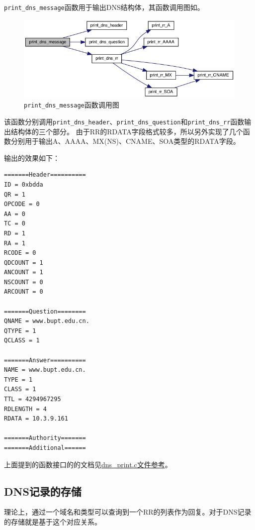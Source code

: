 \documentclass[lang=cn,11pt,a4paper,cite=authornum]{paper}
\begin{document}
\texttt{print_dns_message}函数用于输出DNS结构体，其函数调用图如。

\begin{figure}[htbp]

    \centering
    \includegraphics[width=0.8\linewidth]{./APIdoc/dns__print_8c_a33a39397e0f2e1a98b86b6d85321ee79_cgraph.png}
    \caption{\texttt{print_dns_message}函数调用图\label{fig:print_dns_message_call}}

\end{figure}

该函数分别调用\texttt{print_dns_header}、\texttt{print_dns_question}和\texttt{print_dns_rr}函数输出结构体的三个部分。
由于RR的RDATA字段格式较多，所以另外实现了几个函数分别用于输出A、AAAA、MX(NS)、CNAME、SOA类型的RDATA字段。

输出的效果如下：

\begin{code}
\begin{verbatim}
=======Header==========
ID = 0xbdda
QR = 1
OPCODE = 0
AA = 0
TC = 0
RD = 1
RA = 1
RCODE = 0
QDCOUNT = 1
ANCOUNT = 1
NSCOUNT = 0
ARCOUNT = 0

=======Question========
QNAME = www.bupt.edu.cn.
QTYPE = 1
QCLASS = 1

=======Answer==========
NAME = www.bupt.edu.cn.
TYPE = 1
CLASS = 1
TTL = 4294967295
RDLENGTH = 4
RDATA = 10.3.9.161

=======Authority=======
=======Additional======
\end{verbatim}
\end{code}

上面提到的函数接口的的文档见\href{run:./APIdoc/dns__print_8c.html}{dns\_print.c文件参考}。

\subsection{DNS记录的存储}

理论上，通过一个域名和类型可以查询到一个RR的列表作为回复。对于DNS记录的存储就是基于这个对应关系。
\end{document}
